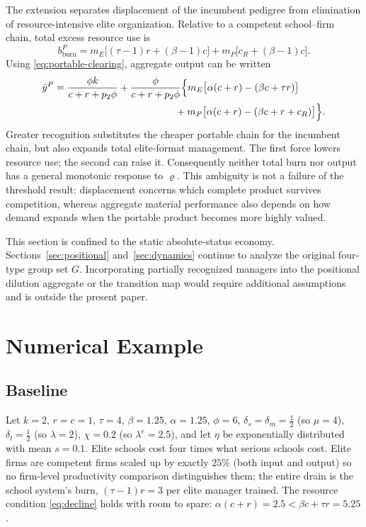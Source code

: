 \documentclass[12pt,letterpaper]{article}
\theoremstyle{definition}
\begin{document}
The extension separates displacement of the incumbent pedigree from elimination of
resource-intensive elite organization.
Relative to a competent school--firm chain, total excess resource use is
\begin{equation}\label{eq:portable-burn}
  b_{\mathrm{burn}}^P
  =
  m_E\big[(\tau-1)r+(\beta-1)c\big]
  +
  m_P\big[c_R+(\beta-1)c\big].
\end{equation}
Using \eqref{eq:portable-clearing}, aggregate output can be written
\begin{align}
\bar y^P
&=
\frac{\phi k}{c+r+p_2\phi}
+
\frac{\phi}{c+r+p_2\phi}
\Big\{
  m_E\big[\alpha(c+r)-(\beta c+\tau r)\big] \notag\\
&\hspace{43mm}
  +m_P\big[\alpha(c+r)-(\beta c+r+c_R)\big]
\Big\}.
\label{eq:portable-output}
\end{align}
Greater recognition substitutes the cheaper portable chain for the incumbent chain, but
also expands total elite-format management.
The first force lowers resource use; the second can raise it.
Consequently neither total burn nor output has a general monotonic response to
$\varrho$.
This ambiguity is not a failure of the threshold result: displacement concerns which
complete product survives competition, whereas aggregate material performance also
depends on how demand expands when the portable product becomes more highly valued.

This section is confined to the static absolute-status economy.
Sections~\ref{sec:positional} and~\ref{sec:dynamics} continue to analyze the original
four-type group set $G$.
Incorporating partially recognized managers into the positional dilution aggregate or the
transition map would require additional assumptions and is outside the present paper.

\section{Numerical Example}\label{sec:example}

\subsection{Baseline}

Let $k=2$, $r=c=1$, $\tau=4$, $\beta=1.25$, $\alpha=1.25$, $\phi=6$, $\delta_s=\delta_m=\tfrac12$ (so $\mu=4$), $\delta_l=\tfrac12$ (so $\lambda=2$), $\chi=0.2$ (so $\lambda^{e}=2.5$), and let $\eta$ be exponentially distributed with mean $s=0.1$.
Elite schools cost four times what serious schools cost.
Elite firms are competent firms scaled up by exactly $25\%$ (both input and output) so no firm-level productivity comparison distinguishes them; the entire drain is the school system's burn, $(\tau-1)r=3$ per elite manager trained.
The resource condition \eqref{eq:decline} holds with room to spare: $\alpha(c+r)=2.5 < \beta c+\tau r = 5.25$.
\end{document}
